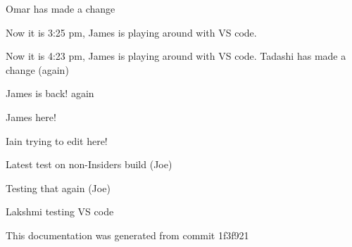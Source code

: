 \label{index_md_repo_README}%
%
Omar has made a change

Now it is 3\+:25 pm, James is playing around with VS code.

Now it is 4\+:23 pm, James is playing around with VS code. Tadashi has made a change (again)

James is back! again

James here!

Iain trying to edit here!

Latest test on non-\/\+Insiders build (Joe)

Testing that again (Joe)

Lakshmi testing VS code

This documentation was generated from commit 1f3f921 